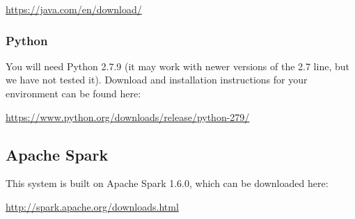 \href{https://java.com/en/download/}{https://java.com/en/download/}

\subsubsection{Python}
You will need Python 2.7.9 (it may work with newer versions of the 2.7 line, but we have not tested it). Download and installation instructions for your environment can be found here:

\href{https://www.python.org/downloads/release/python-279/}{https://www.python.org/downloads/release/python-279/}

\subsection{Apache Spark}
This system is built on Apache Spark 1.6.0, which can be downloaded here:

\href{http://spark.apache.org/downloads.html}{http://spark.apache.org/downloads.html}









